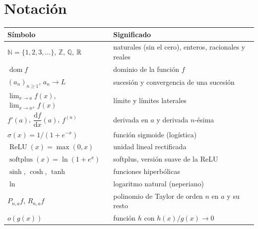 \documentclass[11pt,a4paper,twoside,openany]{book}
\newcommand{\N}{\mathbb{N}}
\newcommand{\Z}{\mathbb{Z}}
\newcommand{\Q}{\mathbb{Q}}
\newcommand{\dom}{\operatorname{dom}}
\newcommand{\ReLU}{\operatorname{ReLU}}
\newcommand{\softplus}{\operatorname{softplus}}
\newcommand{\dd}{\mathrm{d}}
\begin{document}
\section*{Notación}
\begin{center}
\small
\begin{tabular}{@{}ll@{}}
\toprule
Símbolo & Significado \\
\midrule
$\N=\{1,2,3,\dots\}$, $\Z$, $\Q$, $\mathbb{R}$ & naturales (sin el cero), enteros, racionales y reales \\
$\dom f$ & dominio de la función $f$ \\
$(a_n)_{n\ge1}$, $a_n\to L$ & sucesión y convergencia de una sucesión \\
$\lim_{x\to a}f(x)$, $\lim_{x\to a^{\pm}}f(x)$ & límite y límites laterales \\
$f'(a)$, $\dfrac{\dd f}{\dd x}(a)$, $f^{(n)}$ & derivada en $a$ y derivada $n$-ésima \\
$\sigma(x)=1/(1+e^{-x})$ & función sigmoide (logística) \\
$\ReLU(x)=\max(0,x)$ & unidad lineal rectificada \\
$\softplus(x)=\ln(1+e^{x})$ & softplus, versión suave de la ReLU \\
$\sinh$, $\cosh$, $\tanh$ & funciones hiperbólicas \\
$\ln$ & logaritmo natural (neperiano) \\
$P_{n,a}f$, $R_{n,a}f$ & polinomio de Taylor de orden $n$ en $a$ y su resto \\
$o(g(x))$ & función $h$ con $h(x)/g(x)\to0$ \\
\bottomrule
\end{tabular}
\end{center}


\tableofcontents

\mainmatter







\backmatter

\end{document}

